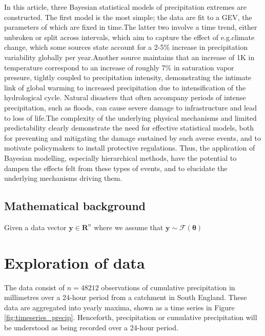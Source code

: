 \documentclass[12pt, a4paper]{article}
\begin{document}
  In this article, three Bayesian statistical models of precipitation extremes
  are constructed. The first model is the most simple; the data are fit to a
  GEV, the parameters of which are fixed in time.\@ The latter two involve a
  time trend, either unbroken or split across intervals, which aim to capture
  the effect of e.g.\@ climate change, which some sources state account for a
  2-5\% increase in precipitation variability globally per year.\@ Another
  source maintains that an increase of 1K in temperature correspond to an
  increase of roughly 7\% in saturation vapor pressure, tightly coupled to
  precipitation intensity, demonstrating the intimate link of global warming to
  increased precipitation due to intensification of the hydrological cycle.\@
  Natural disasters that often accompany periods of intense precipitation, such
  as floods, can cause severe damage to infrastructure and lead to loss of
  life.\@ The complexity of the underlying physical mechanisms and limited
  predictability clearly demonstrate the need for effective statistical models,
  both for preventing and mitigating the damage sustained by such averse
  events, and to motivate policymakers to install protective regulations.\@
  Thus, the application of Bayesian modelling, especially hierarchical methods,
  have the potential to dampen the effects felt from these types of events, and
  to elucidate the underlying mechanisms driving them.

  \subsection{Mathematical background}
  Given a data vector \(\bm y \in \mathbf R^n\) where we assume that
  \(\bm y \sim \mathcal F(\bm \theta)\)
  
  \section{Exploration of data}
  The data consist of \(n = 48212\) observations of cumulative precipitation
  in millimetres over a 24-hour period from a catchment in South England. 
  These data are aggregated into yearly maxima, shown as a time series in
  Figure \ref{fig:timeseries_precip}. Henceforth, precipitation or cumulative
  precipitation will be understood as being recorded over a 24-hour period. 
\end{document}
